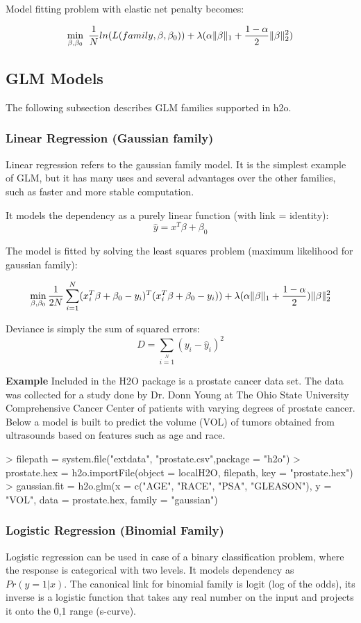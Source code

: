 \documentclass[11pt]{article}
\begin{document}
Model fitting problem with elastic net penalty becomes:

\[ \min\limits_{\beta,\beta_0}\ {{1\over{N}} ln(L(family,\beta,\beta_0))  + \lambda (\alpha \| \beta \|_1}  + {1- \alpha \over 2} \| \beta \|_2^2) \]


\subsection{GLM Models} 
The following subsection describes GLM families supported in h2o. 

\subsubsection{Linear Regression (Gaussian family) }
Linear regression refers to the gaussian family model. It is the simplest example of GLM, but it has many uses and several advantages over the other families, such as faster and more stable computation. 

It models the dependency as a purely linear function (with link = identity):
\[ \hat{y} = x^T\beta + \beta_0\]

The model is fitted by solving the least squares problem (maximum likelihood for gaussian family):

\[ \min\limits_{\beta,\beta_0} { {1 \over 2N}\sum\limits_{i=1}\limits^{N}(x_i^{T}\beta  + \beta_0- y_i)^T (x_i^{T}\beta + \beta_0 - y_i))  + \lambda (\alpha \|\beta \|_1 + {1-\alpha \over 2}) \| \beta \|_2^2} \]


Deviance is simply the sum of squared errors:
\[ D = \sum\limits_{i=1}\limits^{N}{(y_i - \hat{y}_i)^2} \]


\textbf{Example}
Included in the H2O package is a prostate cancer data set. The data was collected for a study done by Dr. Donn Young at The Ohio State University Comprehensive Cancer Center of patients with varying degrees of prostate cancer. Below a model is built to predict the volume (VOL) of tumors obtained from ultrasounds based on features such as age and race.

\begin{spverbatim}
> filepath = system.file("extdata", "prostate.csv",package = "h2o")
> prostate.hex = h2o.importFile(object = localH2O, filepath, key = "prostate.hex")
> gaussian.fit = h2o.glm(x = c("AGE", "RACE", "PSA", "GLEASON"), y = "VOL", data = prostate.hex, family = "gaussian")
\end{spverbatim}

\subsubsection{Logistic Regression (Binomial Family)}
Logistic regression can be used in case of a binary classification problem, where the response is categorical with two levels. It models dependency as $Pr(y = 1|x)$. The canonical link for binomial family is logit (log of the odds), its inverse is a logistic function that takes any real number on the input and projects it onto the 0,1 range (s-curve). 
\end{document}
